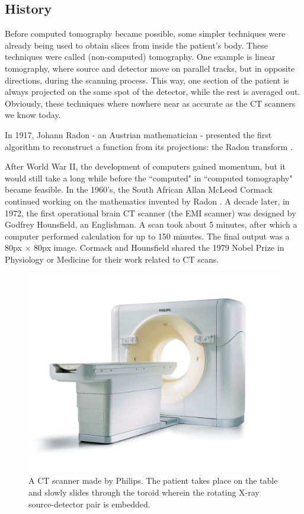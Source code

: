 \subsection{History}
Before computed tomography became possible, some simpler techniques were already
being used to obtain slices from inside the patient's body. These techniques
were called (non-computed) tomography. One example is linear tomography,
where source and detector move on parallel tracks, but in opposite directions,
during the scanning process. This way, one section of the patient is always
projected on the same spot of the detector, while the rest is averaged out.
Obviously, these techniques where nowhere near as accurate as the CT scanners we
know today.

In 1917, Johann Radon - an Austrian mathematician - presented the first
algorithm to reconstruct a function from its projections: the Radon transform
\cite{radon}.

After World War II, the development of computers gained momentum, but it would
still take a long while before the ``computed" in ``computed tomography" became
feasible. In the 1960's, the South African Allan McLeod Cormack continued
working on the mathematics invented by Radon \cite{ctreview}. A decade later, in
1972, the first operational brain CT scanner (the EMI scanner) was designed by
Godfrey Hounsfield, an Englishman. A scan took about 5 minutes, after which a
computer performed calculation for up to 150 minutes. The final output was a
80px $\times$ 80px image. Cormack and Hounsfield shared the 1979 Nobel Prize in
Physiology or Medicine for their work related to CT scans.

\begin{figure}[ht]
\begin{center}
  \includegraphics[width=\linewidth]{img/ctscanner.jpg}
  \caption{A CT scanner made by Philips. The patient takes place on the table
  and slowly slides through the toroid wherein the rotating X-ray
  source-detector pair is embedded.}
  \label{fig:ctscanner}
\end{center}
\end{figure}

